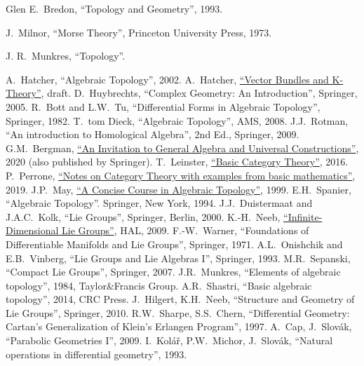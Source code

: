 \begin{thebibliography}{}
     Glen E.~Bredon, ``Topology and Geometry'', 1993.
    
    
    J.~Milnor, ``Morse Theory'', Princeton University Press, 1973.
    
    J. R.~Munkres, ``Topology''.
    
     A.~Hatcher, ``Algebraic Topology'', 2002.
     A.~Hatcher, \href{https://pi.math.cornell.edu/~hatcher/VBKT/VB.pdf}{``Vector Bundles and K-Theory''}, draft.
     D.~Huybrechts, ``Complex Geometry: An Introduction'', Springer, 2005.
     R.~Bott and L.W.~Tu, ``Differential Forms in Algebraic Topology'', Springer, 1982.
     T.~tom Dieck, ``Algebraic Topology'', AMS, 2008.
     J.J.~Rotman, ``An introduction to Homological Algebra'', 2nd Ed., Springer, 2009.
     G.M.~Bergman, \href{https://math.berkeley.edu/~gbergman/245/}{``An Invitation to General Algebra and Universal Constructions''}, 2020 (also published by Springer).
     T.~Leinster, \href{https://arxiv.org/abs/1612.09375}{``Basic Category Theory''}, 2016.
     P.~Perrone, \href{https://arxiv.org/abs/1912.10642}{``Notes on Category Theory with examples from basic mathematics''}, 2019.
     J.P.~May, \href{https://www.math.uchicago.edu/~may/CONCISE/ConciseRevised.pdf}{``A Concise Course in Algebraic Topology''}, 1999.
     E.H.~Spanier, ``Algebraic Topology''. Springer, New York, 1994.
     J.J.~Duistermaat and J.A.C.~Kolk, ``Lie Groups'', Springer, Berlin, 2000.
     K.-H.~Neeb, \href{https://cel.hal.science/cel-00391789}{``Infinite-Dimensional Lie Groups''}, HAL, 2009.
     F.-W.~Warner, ``Foundations of Differentiable Manifolds and Lie Groups'', Springer, 1971.
     A.L.~Onishchik and E.B.~Vinberg, ``Lie Groups and Lie Algebras I'', Springer, 1993.
     M.R.~Sepanski, ``Compact Lie Groups'', Springer, 2007.
     J.R.~Munkres, ``Elements of algebraic topology'', 1984, Taylor\&Francis Group.
     A.R.~Shastri, ``Basic algebraic topology'', 2014, CRC Press.
     J.~Hilgert, K.H.~Neeb, ``Structure and Geometry of Lie Groups'', Springer, 2010.
      R.W.~Sharpe, S.S.~Chern, ``Differential Geometry: Cartan's Generalization of Klein's Erlangen Program'', 1997.
     A.~Cap, J.~Slov\'ak, ``Parabolic Geometries I'', 2009.
     I.~Kol\'a\v{r}, P.W.~Michor, J.~Slov\'ak, ``Natural operations in differential geometry'', 1993.

\end{thebibliography}
